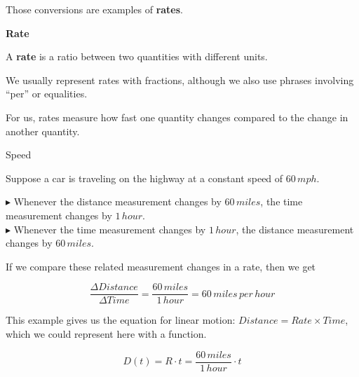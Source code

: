 \documentclass{ximera}
\begin{document}
Those conversions are examples of \textbf{rates}. 








\begin{definition} \textbf{\textcolor{green!50!black}{Rate}} 

A \textbf{rate} is a ratio between two quantities with different units.   



We usually represent rates with fractions, although we also use phrases involving ``per'' or equalities.

\end{definition}


For us, rates measure how fast one quantity changes compared to the change in another quantity.











\begin{example} Speed


Suppose a car is traveling on the highway at a constant speed of $60 \, mph$.


$\blacktriangleright$ Whenever the distance measurement changes by $60 \, miles$, the time measurement changes by $1 \, hour$. \\
$\blacktriangleright$ Whenever the time measurement changes by $1 \, hour$, the distance measurement changes by $60 \, miles$. 




If we compare these related measurement changes in a rate, then we get

\[
\frac{\Delta Distance}{\Delta Time} = \frac{60 \, miles}{1 \, hour} = 60 \,miles \, per \, hour
\]


\end{example} 



This example gives us the equation for linear motion: $Distance = Rate \times Time$, which we could represent here with a function.

\[
D(t) = R \cdot t =  \frac{60 \, miles}{1 \, hour} \cdot t
\]
\end{document}
